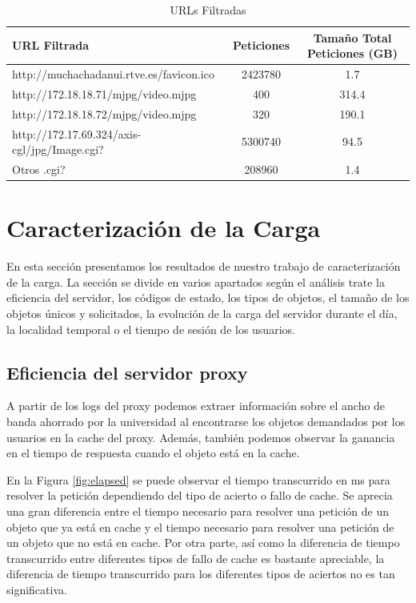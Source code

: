 \documentclass[twocolumn]{Jornadas}
\begin{document}
\begin{table}[ht!]
\centering
\renewcommand{\baselinestretch}{1.5}
\scriptsize
\begin{tabular}{|l||c|c|} \hline
URL Filtrada                                  & Peticiones & Tamaño Total Peticiones (GB) \\\hline\hline
http://muchachadanui.rtve.es/favicon.ico      & 2423780    & 1.7                          \\\hline  
http://172.18.18.71/mjpg/video.mjpg           & 400        & 314.4                        \\\hline 
http://172.18.18.72/mjpg/video.mjpg           & 320        & 190.1                        \\\hline 
http://172.17.69.324/axis-cgl/jpg/Image.cgi?  & 5300740    & 94.5                         \\\hline 
Otros .cgi?                                   & 208960     & 1.4                          \\\hline 
\end{tabular}
\caption{URLs Filtradas}
\label{table:url}
\end{table}


\section{Caracterización de la Carga}
\label{resultados}

En esta sección presentamos los resultados de nuestro trabajo de caracterización de la carga. La sección se divide en varios apartados según el análisis trate la eficiencia del servidor, los códigos de estado, los tipos de objetos, el tamaño de los objetos únicos y solicitados, la evolución de la carga del servidor durante el día, la localidad temporal o el tiempo de sesión de los usuarios.

\subsection{Eficiencia del servidor proxy}\label{eficiencia}
A partir de los logs del proxy podemos extraer información sobre el ancho de banda ahorrado por la universidad al encontrarse los objetos demandados por los usuarios en la cache del proxy. Además, también podemos observar la ganancia en el tiempo de respuesta cuando el objeto está en la cache.

En la Figura \ref{fig:elapsed} se puede observar el tiempo transcurrido en ms para resolver la petición dependiendo del tipo de acierto o fallo de cache. Se aprecia una gran diferencia entre el tiempo necesario para resolver una petición de un objeto que ya está en cache y el tiempo necesario para resolver una petición de un objeto que no está en cache. Por otra parte, así como la diferencia de tiempo transcurrido entre diferentes tipos de fallo de cache es bastante apreciable, la diferencia de tiempo transcurrido para los diferentes tipos de aciertos no es tan significativa.
\end{document}
